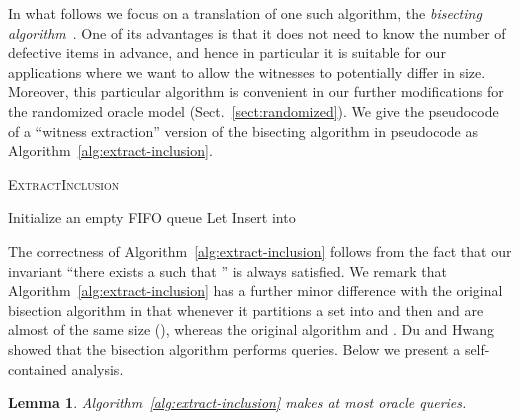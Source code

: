 \documentclass[11pt]{article}
\newtheorem{lemma}[theorem]{Lemma}
\begin{document}
In what follows we focus on a translation of one such algorithm, the {\em bisecting algorithm}~\cite{DuHwang1993}. One of its advantages is that it does not need to know the number of defective items in advance, and hence in particular it is suitable for our applications where we want to allow the witnesses to potentially differ in size. 
Moreover, this particular algorithm is convenient in our further modifications for the randomized oracle model (Sect.~\ref{sect:randomized}). 
We give the pseudocode of a ``witness extraction'' version of the bisecting algorithm in pseudocode as Algorithm~\ref{alg:extract-inclusion}. 

{
\begin{algorithm}[t]
\caption{\textsc{ExtractInclusion}}
\label{alg:extract-inclusion}
\footnotesize
  Initialize an empty FIFO queue \;
  Let \;
  Insert  into \;
  \Return{}
\end{algorithm}
}

The correctness of Algorithm~\ref{alg:extract-inclusion} follows from the fact that our invariant ``there exists a  such that '' is always satisfied. We remark that Algorithm~\ref{alg:extract-inclusion} has a further minor difference with the original bisection algorithm in that whenever it partitions a set  into  and  then  and  are almost of the same size (), whereas the original algorithm  and . Du and Hwang~\cite{DuHwang1993} showed that the bisection algorithm performs  queries. Below we present a self-contained analysis.

\begin{lemma}
\label{lem:deterministic-extraction}
Algorithm~\ref{alg:extract-inclusion} makes at most 
 oracle queries.
\end{lemma}
\end{document}

